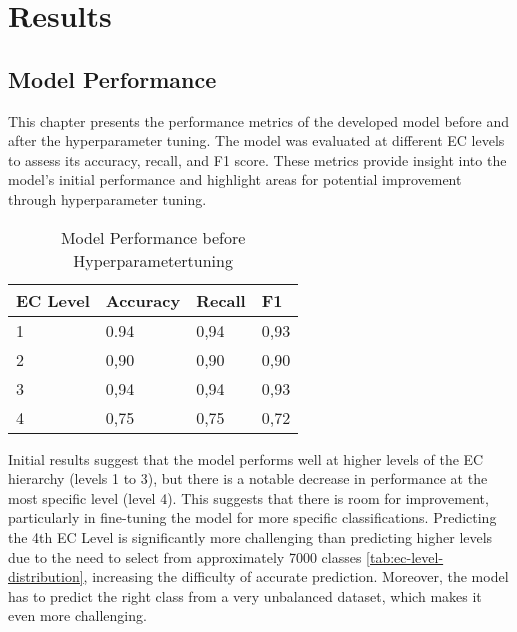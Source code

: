 \section{Results}

\subsection{Model Performance}
\label{sec:Model Performance}

This chapter presents the performance metrics of the developed model before and after the hyperparameter tuning. The model was evaluated at different EC levels to assess its accuracy, recall, and F1 score. These metrics provide insight into the model's initial performance and highlight areas for potential improvement through hyperparameter tuning.

\begin{table}[hbt]
    \centering
    \begin{tabular}{@{}llll@{}}
    \toprule
    \textbf{EC Level} & \textbf{Accuracy} & \textbf{Recall} & \textbf{F1} \\ \midrule
    1                 & 0.94              & 0,94            & 0,93        \\
    2                 & 0,90              & 0,90            & 0,90        \\
    3                 & 0,94              & 0,94            & 0,93        \\
    4                 & 0,75              & 0,75            & 0,72        \\ \bottomrule
    \end{tabular}
    \caption{Model Performance before Hyperparametertuning}
    \label{tab:performance-before-tuning}
\end{table}

Initial results suggest that the model performs well at higher levels of the EC hierarchy (levels 1 to 3), but there is a notable decrease in performance at the most specific level (level 4). This suggests that there is room for improvement, particularly in fine-tuning the model for more specific classifications. Predicting the 4th EC Level is significantly more challenging than predicting higher levels due to the need to select from approximately 7000 classes \ref{tab:ec-level-distribution}, increasing the difficulty of accurate prediction. Moreover, the model has to predict the right class from a very unbalanced dataset, which makes it even more challenging.

